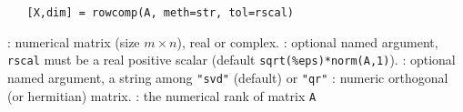 

\begin{mandesc}
\end{mandesc}

\begin{calling_sequence}
\begin{verbatim}
   [X,dim] = rowcomp(A, meth=str, tol=rscal) 
\end{verbatim}
\end{calling_sequence}
\begin{parameters}
  \begin{varlist}
    :  numerical matrix (size $m \times n$), real or complex.
    : optional named argument, \verb+rscal+ must be  a real positive scalar 
    (default \verb+sqrt(%eps)*norm(A,1)+).
    : optional named argument, a string among \verb+"svd"+ (default) or \verb+"qr"+
    : numeric orthogonal (or hermitian) matrix.
    : the numerical rank of matrix \verb!A!
  \end{varlist}
\end{parameters}

